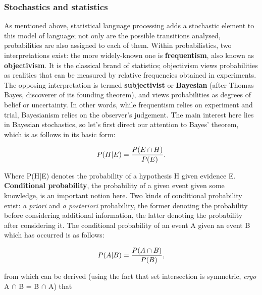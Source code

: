 \subsubsection{Stochastics and statistics} %
\label{ssub:stochastics}

As mentioned above, statistical language processing adds a stochastic element
to this model of language; not only are the possible transitions analysed,
probabilities are also assigned to each of them. Within probabilistics, two
interpretations exist: the more widely-known one is \textbf{frequentism}, also
known as \textbf{objectivism}. It is the classical brand of statistics;
objectivism views probabilities as realities that can be measured by relative
frequencies obtained in experiments. The opposing interpretation is termed
\textbf{subjectivist} or \textbf{Bayesian} (after Thomas Bayes, discoverer of
its founding theorem), and views probabilities as degrees of belief or
uncertainty. In other words, while frequentism relies on experiment and trial,
Bayesianism relies on the observer's judgement. The main interest here lies in
Bayesian stochastics, so let's first direct our attention to Bayes' theorem,
which is as follows in its basic form:

\begin{equation}
  \\P(H|E)=\frac{\\P(E \cap H)}{\\P(E)}.
\end{equation}

Where P(H|E) denotes the probability of a hypothesis H given evidence E.
\textbf{Conditional probability}, the probability of a given event given some
knowledge, is an important notion here. Two kinds of conditional probability
exist: \textit{a priori} and \textit{a posteriori} probability, the former
denoting the probability before considering additional information, the latter
denoting the probability after considering it. The conditional probability of
an event A given an event B which has occurred is as follows:

\begin{equation}
\\P(A|B) = \frac{\\P(A \cap B)}{\\P(B)},
\end{equation}

from which can be derived (using the fact that set intersection is symmetric,
\textit{ergo} A $\cap$ B = B $\cap$ A) that

